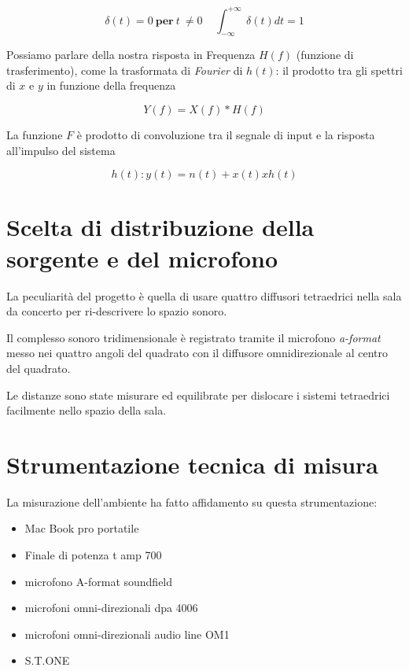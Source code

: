 \begin{equation}
\delta(t) = 0~\textbf{per}~t~\neq 0~~~~~\int_{-\infty}^{+\infty}~\delta(t)dt=1
\end{equation}


Possiamo parlare della nostra risposta in Frequenza $H(f)$ (funzione di trasferimento),
come la  trasformata di \emph{Fourier} di $h(t)$: il prodotto tra gli spettri di $x$ e $y$ in funzione della frequenza

\begin{equation}
Y(f)= X(f)*H(f) 
\end{equation}

La funzione $F$ è prodotto di convoluzione tra il segnale di input e la risposta all'impulso del sistema

\begin{equation}
h(t):y(t)= n(t) + x(t) x h(t)
\end{equation}

\section{Scelta di distribuzione della sorgente e del microfono}

La peculiarità del progetto è quella di usare  quattro diffusori tetraedrici nella sala
da concerto per ri-descrivere lo spazio sonoro.

Il complesso sonoro tridimensionale è registrato tramite il microfono \emph{a-format}
messo nei quattro angoli del quadrato con il diffusore omnidirezionale al centro del quadrato. 

Le distanze sono state misurare ed equilibrate per dislocare i sistemi tetraedrici
facilmente nello spazio della sala.

\section{Strumentazione tecnica di misura}

La misurazione dell'ambiente ha fatto affidamento su questa strumentazione:

\begin{itemize}
	\item Mac Book pro portatile
	\item Finale di potenza t amp 700
	\item microfono A-format soundfield
	\item microfoni omni-direzionali dpa 4006
	\item microfoni omni-direzionali audio line OM1
	\item S.T.ONE
\end{itemize}

